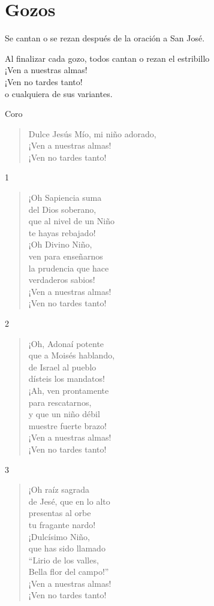 \documentclass[spanish,utf8,twocolumn]{chlart}
\newenvironment{summary}{\begingroup
	\small\sffamily\itshape%
	\setlength{\leftskip}{3em}\setlength{\rightskip}{3em}\noindent
	}{\par\endgroup}
\newenvironment{gozo}{\begin{verse}\color{lector}}{\end{verse}}
\newcommand*\vena{{\color{responden}\hspace{1em}¡Ven a nuestras almas!\\\hspace{1em}¡Ven no tardes tanto!}}
\begin{document}
\section{Gozos}
\begin{summary}
Se cantan o se rezan después de la oración a San José.

Al finalizar cada gozo, todos cantan o rezan el estribillo \\\vena\\o cualquiera de sus variantes.
\end{summary}

Coro
\begin{gozo}
Dulce Jesús Mío, mi niño adorado,\\
\vena
\end{gozo}

1
\begin{gozo}
¡Oh Sapiencia suma\\del Dios soberano,\\
que al nivel de un Niño\\te hayas rebajado!\\
¡Oh Divino Niño,\\ven para enseñarnos\\
la prudencia que hace\\verdaderos sabios!\\
\vena
\end{gozo}

2
\begin{gozo}
¡Oh, Adonaí potente\\
que a Moisés hablando,\\
de Israel al pueblo\\
dísteis los mandatos!\\
¡Ah, ven prontamente\\
para rescatarnos,\\
y que un niño débil\\
muestre fuerte brazo!\\
\vena
\end{gozo}

3
\begin{gozo}
¡Oh raíz sagrada\\
de Jesé, que en lo alto\\
presentas al orbe\\
tu fragante nardo!\\
¡Dulcísimo Niño,\\
que has sido llamado\\
“Lirio de los valles,\\
Bella flor del campo!”\\
\vena
\end{gozo}
\end{document}
